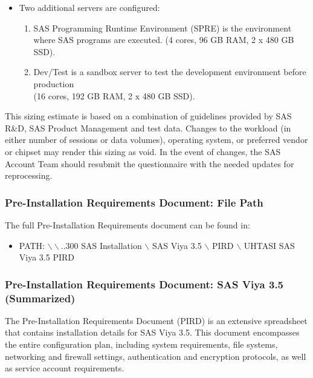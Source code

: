 \begin{enumerate}
\begin{itemize}
        \item Two additional servers are configured: 
        \begin{enumerate}
            \item SAS Programming Runtime Environment (SPRE) is the environment where SAS programs are executed. (4 cores, 96 GB RAM, 2 x 480 GB SSD). 
            \item Dev/Test is a sandbox server to test the development environment before production \\(16 cores, 192 GB RAM, 2 x 480 GB SSD).
        \end{enumerate}
    \end{itemize}
    
\end{enumerate}

This sizing estimate is based on a combination of guidelines provided by SAS R\&D, SAS Product Management and test data. Changes to the workload (in either number of sessions or data volumes), operating system, or preferred vendor or chipset may render this sizing as void. In the event of changes, the SAS Account Team should resubmit the questionnaire with the needed updates for reprocessing. 

\subsubsection{Pre-Installation Requirements Document: File Path}\label{6.2.7}
The full Pre-Installation Requirements document can be found in: 
\begin{itemize}
    \item PATH: $\backslash\backslash$..300 SAS Installation $\backslash$ SAS Viya 3.5 $\backslash$ PIRD $\backslash$ UHTASI SAS Viya 3.5 PIRD
\end{itemize}

\subsubsection{Pre-Installation Requirements Document: SAS Viya 3.5 (Summarized)}

The Pre-Installation Requirements Document (PIRD) is an extensive spreadsheet that contains installation details for SAS Viya 3.5. This document encompasses the entire configuration plan, including system requirements, file systems, networking and firewall settings, authentication and encryption protocols, as well as service account requirements.

